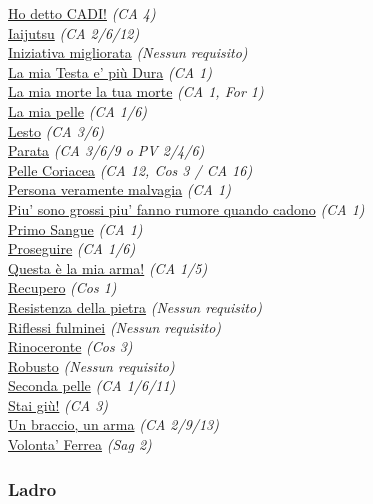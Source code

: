 \begin{multicols}{3}
{\begin{flushleft}
\hyperlink{Ho detto CADI!}{Ho detto CADI!} \textit{(CA 4)}\\
\hyperlink{Iaijutsu}{Iaijutsu} \textit{(CA 2/6/12)}\\
\hyperlink{Iniziativa migliorata}{Iniziativa migliorata} \textit{(Nessun requisito)}\\
\hyperlink{La mia Testa e' più Dura}{La mia Testa e' più Dura} \textit{(CA 1)}\\
\hyperlink{La mia morte la tua morte}{La mia morte la tua morte} \textit{(CA 1, For 1)}\\
\hyperlink{La mia pelle}{La mia pelle} \textit{(CA 1/6)}\\
\hyperlink{Lesto}{Lesto} \textit{(CA 3/6)}\\
\hyperlink{Parata}{Parata} \textit{(CA 3/6/9 o PV 2/4/6)}\\
\hyperlink{Pelle Coriacea}{Pelle Coriacea} \textit{(CA 12, Cos 3 / CA 16)}\\
\hyperlink{Persona veramente malvagia}{Persona veramente malvagia} \textit{(CA 1)}\\
\hyperlink{Piu' sono grossi piu' fanno rumore quando cadono}{Piu' sono grossi piu' fanno rumore quando cadono} \textit{(CA 1)}\\
\hyperlink{Primo Sangue}{Primo Sangue} \textit{(CA 1)}\\
\hyperlink{Proseguire}{Proseguire} \textit{(CA 1/6)}\\
\hyperlink{Questa è la mia arma!}{Questa è la mia arma!} \textit{(CA 1/5)}\\
\hyperlink{Recupero}{Recupero} \textit{(Cos 1)}\\
\hyperlink{Resistenza della pietra}{Resistenza della pietra} \textit{(Nessun requisito)}\\
\hyperlink{Riflessi fulminei}{Riflessi fulminei} \textit{(Nessun requisito)}\\
\hyperlink{Rinoceronte}{Rinoceronte} \textit{(Cos 3)}\\
\hyperlink{Robusto}{Robusto} \textit{(Nessun requisito)}\\
\hyperlink{Seconda pelle}{Seconda pelle} \textit{(CA 1/6/11)}\\
\hyperlink{Stai giù!}{Stai giù!} \textit{(CA 3)}\\
\hyperlink{Un braccio, un arma}{Un braccio, un arma} \textit{(CA 2/9/13)}\\
\hyperlink{Volonta' Ferrea}{Volonta' Ferrea} \textit{(Sag 2)}\\


\titlespacing*{\subsubsection}{0pt}{0.5em}{0.5em}\subsubsection*{Ladro}


\end{flushleft}}
\end{multicols}
